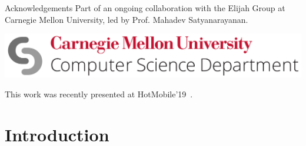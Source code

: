 \documentclass[aspectratio=1610]{beamer}
\begin{document}
\begin{frame}
    \begin{block}{Acknowledgements}
        Part of an ongoing collaboration with the Elijah Group at Carnegie Mellon University, led by Prof. Mahadev Satyanarayanan.\\
        \vspace{3em}
        \begin{center}
            \includegraphics[width=.7\linewidth]{img/cmu_csd.png}\\
        \end{center}
        \vspace{3em}
        This work was recently presented at HotMobile'19~\autocite{Olguin:EdgeDroid2019}.
    \end{block}
\end{frame}


\section{Introduction}
\begin{frame}{}
    \begin{center}
        \\
    \end{center}
\end{frame}
\end{document}

